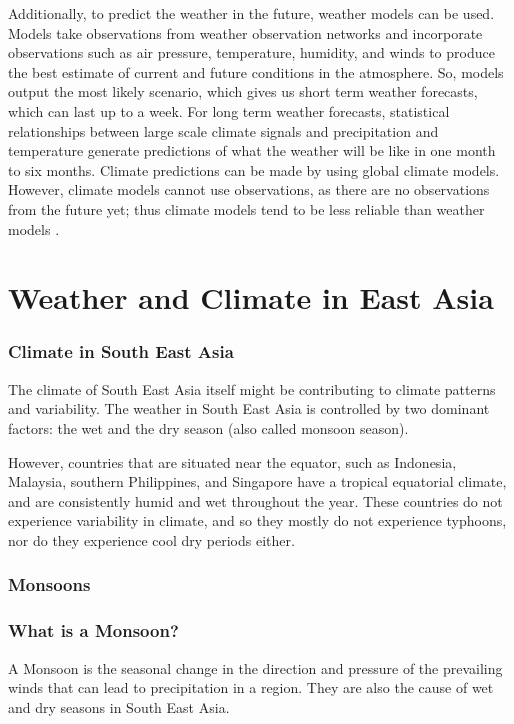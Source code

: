 Additionally, to predict the weather in the future, weather models can be used. Models take observations from weather observation networks and incorporate observations such as air pressure, temperature, humidity, and winds to produce the best estimate of current and future conditions in the atmosphere. So, models output the most likely scenario, which gives us short term weather forecasts, which can last up to a week. For long term weather forecasts, statistical relationships between large scale climate signals and precipitation and temperature generate predictions of what the weather will be like in one month to six months. Climate predictions can be made by using global climate models. However, climate models cannot use observations, as there are no observations from the future yet; thus climate models tend to be less reliable than weather models \citep{nasaclimaterecords}.

\section{Weather and Climate in East Asia}

\subsubsection{Climate in South East Asia}

The climate of South East Asia itself might be contributing to climate patterns and variability. The weather in South East Asia is controlled by two dominant factors: the wet and the dry season (also called monsoon season). 

However, countries that are situated near the equator, such as Indonesia, Malaysia, southern Philippines, and Singapore have a tropical equatorial climate, and are consistently humid and wet throughout the year.  These countries do not experience variability in climate, and so they mostly do not experience typhoons, nor do they experience cool dry periods either. 

\subsubsection{Monsoons}

\subsubsection{What is a Monsoon?}
A Monsoon is the seasonal change in the direction and pressure of the prevailing winds that can lead to precipitation in a region. They are also the cause of wet and dry seasons in South East Asia. \citep{monsoonform}

